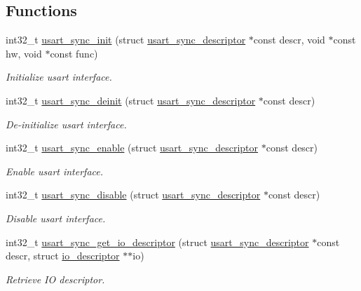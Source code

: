\subsection*{Functions}
\begin{DoxyCompactItemize}
\item 
int32\+\_\+t \hyperlink{group__doc__driver__hal__usart__sync_gaa3cca792d7af7f180c5084af8ffd11c3}{usart\+\_\+sync\+\_\+init} (struct \hyperlink{structusart__sync__descriptor}{usart\+\_\+sync\+\_\+descriptor} $\ast$const descr, void $\ast$const hw, void $\ast$const func)
\begin{DoxyCompactList}\small\item\em Initialize usart interface. \end{DoxyCompactList}\item 
int32\+\_\+t \hyperlink{group__doc__driver__hal__usart__sync_gae8076ed0a30199bd526f1da22e2095d3}{usart\+\_\+sync\+\_\+deinit} (struct \hyperlink{structusart__sync__descriptor}{usart\+\_\+sync\+\_\+descriptor} $\ast$const descr)
\begin{DoxyCompactList}\small\item\em De-\/initialize usart interface. \end{DoxyCompactList}\item 
int32\+\_\+t \hyperlink{group__doc__driver__hal__usart__sync_ga351aa9c8c94b4e8b0eb5efb1ecd74a82}{usart\+\_\+sync\+\_\+enable} (struct \hyperlink{structusart__sync__descriptor}{usart\+\_\+sync\+\_\+descriptor} $\ast$const descr)
\begin{DoxyCompactList}\small\item\em Enable usart interface. \end{DoxyCompactList}\item 
int32\+\_\+t \hyperlink{group__doc__driver__hal__usart__sync_ga76abe691b76e4b95b4e3a7d5bc79b026}{usart\+\_\+sync\+\_\+disable} (struct \hyperlink{structusart__sync__descriptor}{usart\+\_\+sync\+\_\+descriptor} $\ast$const descr)
\begin{DoxyCompactList}\small\item\em Disable usart interface. \end{DoxyCompactList}\item 
int32\+\_\+t \hyperlink{group__doc__driver__hal__usart__sync_gaf0b9c8819dc24f75e4f87f050edc81f5}{usart\+\_\+sync\+\_\+get\+\_\+io\+\_\+descriptor} (struct \hyperlink{structusart__sync__descriptor}{usart\+\_\+sync\+\_\+descriptor} $\ast$const descr, struct \hyperlink{structio__descriptor}{io\+\_\+descriptor} $\ast$$\ast$io)
\begin{DoxyCompactList}\small\item\em Retrieve IO descriptor. \end{DoxyCompactList}\item 
$$
\end{DoxyCompactItemize}
